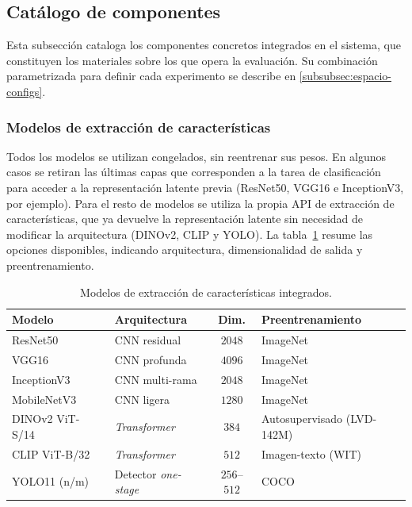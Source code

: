 \subsection{Catálogo de componentes}
\label{subsec:configuraciones}

Esta subsección cataloga los componentes concretos integrados en el sistema,
que constituyen los materiales sobre los que opera la evaluación. Su
combinación parametrizada para definir cada experimento se describe en
\ref{subsubsec:espacio-configs}.

\subsubsection{Modelos de extracción de características}
Todos los modelos se utilizan congelados, sin reentrenar sus pesos. En algunos
casos se retiran las últimas capas que corresponden a la tarea de clasificación
para acceder a la representación latente previa (ResNet50, VGG16 e InceptionV3,
por ejemplo). Para el resto de modelos se utiliza la propia API de extracción
de características, que ya devuelve la representación latente sin necesidad de
modificar la arquitectura (DINOv2, CLIP y YOLO). La
tabla~\ref{tab:embedding-models} resume las opciones disponibles, indicando
arquitectura, dimensionalidad de salida y preentrenamiento.

\begin{table}[h]
  \centering
\begin{tabular}{|p{3.2cm}|p{3.8cm}|c|p{4.2cm}|} \hline
  \textbf{Modelo} & \textbf{Arquitectura} & \textbf{Dim.} & \textbf{Preentrenamiento} \\ \hline
  ResNet50~\cite{he_deep_2015} & CNN residual & $2048$ & ImageNet \\ \hline
  VGG16~\cite{simonyan_very_2015} & CNN profunda & $4096$ & ImageNet \\ \hline
  InceptionV3~\cite{szegedy_rethinking_2015} & CNN multi-rama & $2048$ & ImageNet \\ \hline
  MobileNetV3~\cite{howard_searching_2019} & CNN ligera & $1280$ & ImageNet \\ \hline
  DINOv2 ViT-S/14~\cite{oquab_dinov2_2024} & \textit{Transformer}~\cite{dosovitskiy_image_2021} & $384$ & Autosupervisado (LVD-142M) \\ \hline
  CLIP ViT-B/32~\cite{radford_learning_2021} & \textit{Transformer} & $512$ & Imagen-texto (WIT) \\ \hline
  YOLO11 (n/m)~\cite{ultralytics_ultralytics_2024} & Detector \textit{one-stage} & $256$--$512$ & COCO \\ \hline
\end{tabular}
  \caption{Modelos de extracción de características integrados.}
  \label{tab:embedding-models}
\end{table}

